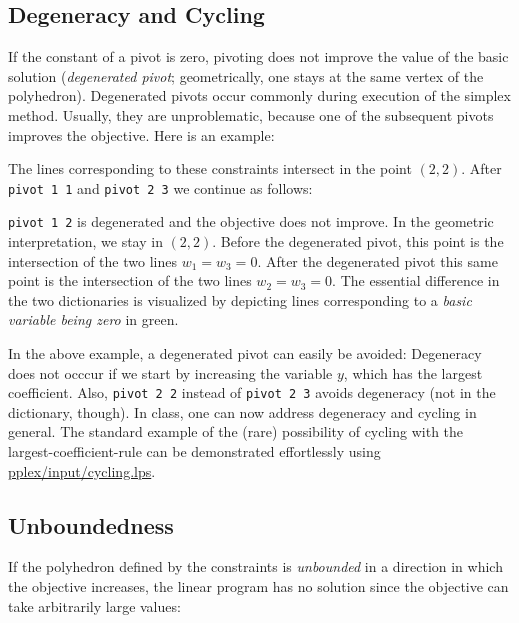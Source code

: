 \documentclass[ukenglish,a4]{article}
\begin{document}
\subsection{Degeneracy and Cycling}\label{sec:cycling}
If the constant of a pivot is zero, pivoting does not improve the value of the basic solution (\emph{degenerated pivot}; geometrically, one stays at the same vertex of the polyhedron). Degenerated pivots occur commonly during execution of the simplex method. Usually, they are unproblematic, because one of the subsequent pivots improves
the objective. Here is an example:
\begin{alltt}

\end{alltt}
The lines corresponding to these constraints intersect in the point $(2,2)$.
After \texttt{pivot 1 1} and \texttt{pivot 2 3} we continue as follows:
\begin{alltt}

\end{alltt}
\texttt{pivot 1 2} is degenerated and the objective does not improve.
In the geometric interpretation, we stay in $(2,2)$. Before the degenerated pivot,
this point is the intersection of the two lines $w_1 = w_3 = 0$. After the degenerated pivot
this same point  is the intersection of the two lines $w_2 = w_3 = 0$.
The essential difference in the two dictionaries is visualized by depicting
lines corresponding to a \emph{basic variable being zero} in green. %

In the above example, a degenerated pivot can easily be avoided:
Degeneracy does not occcur if we start by increasing the
variable $y$, which has the largest coefficient. Also, \texttt{pivot 2 2} 
instead of \texttt{pivot 2 3} avoids degeneracy
(not in the dictionary, though).
In class, one can now address degeneracy and cycling in general. 
The standard example \cite{Chvatal,Vanderbei} of the (rare) possibility of 
cycling with the largest-coefficient-rule can be demonstrated 
effortlessly using \url{pplex/input/cycling.lps}.

\subsection{Unboundedness}\label{sec:unbounded}
If the polyhedron defined by the constraints is 
\emph{unbounded} in a direction in which the objective increases, the linear program has no solution
since the objective can take arbitrarily large values:
\end{document}

